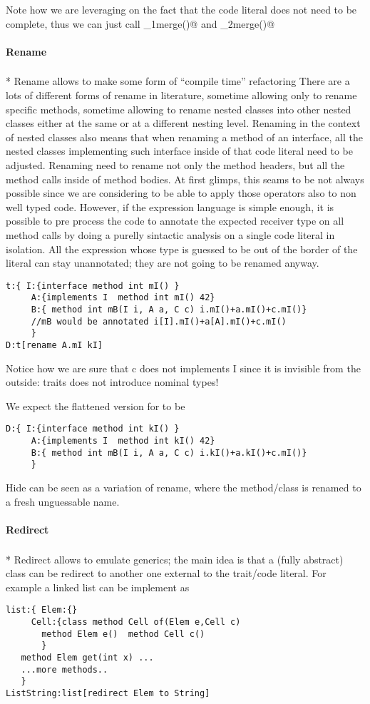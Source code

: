 Note how we are leveraging on the fact that the code literal does not need to be complete, thus we can just call \Q@_1merge()@ and \Q@_2merge()@


\paragraph{Rename}${}_{}$\\*
Rename allows to make some form of ``compile time'' refactoring
There are a lots of different forms of rename in literature,
sometime allowing only to rename specific methods, sometime allowing to rename
nested classes into other nested classes either at the same or at a different nesting level.
Renaming in the context of nested classes also means that when renaming a method of an interface, all the 
nested classes implementing such interface inside of that code literal need to be adjusted.
Renaming need to rename not only the method headers, but all the method calls inside of method bodies.
At first glimps, this seams to be not always possible since we are considering to be able to apply those
operators also to non well typed code.
However, if the expression language is simple enough, it is possible to pre process the code to
annotate the expected receiver type on all method calls by doing a purelly sintactic analysis
on a single code literal in isolation. 
All the expression whose type is guessed to be out of the border of the literal can stay unannotated; they are not going to be renamed anyway.

\begin{lstlisting}
t:{ I:{interface method int mI() }
     A:{implements I  method int mI() 42}
     B:{ method int mB(I i, A a, C c) i.mI()+a.mI()+c.mI()}
     //mB would be annotated i[I].mI()+a[A].mI()+c.mI()
     }
D:t[rename A.mI kI]
\end{lstlisting}
 Notice how we are sure that c does not implements I since it is invisible from the outside: traits does not introduce nominal types!
 
 We expect the flattened version for \Q@D@ to be
\begin{lstlisting}
D:{ I:{interface method int kI() }
     A:{implements I  method int kI() 42}
     B:{ method int mB(I i, A a, C c) i.kI()+a.kI()+c.mI()}
     }
\end{lstlisting}

Hide can be seen as a variation of rename, where the method/class is renamed to a fresh unguessable name.

\paragraph{Redirect}${}_{}$\\*
Redirect allows to emulate generics; the main idea is that a (fully abstract) class can be redirect to another one external to the trait/code literal.
For example a linked list can be implement as
\begin{lstlisting}
list:{ Elem:{}
     Cell:{class method Cell of(Elem e,Cell c) 
       method Elem e()  method Cell c()
       }
   method Elem get(int x) ...
   ...more methods..
   }
ListString:list[redirect Elem to String]
\end{lstlisting}

